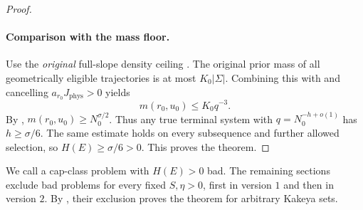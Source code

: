 \begin{proof}
\paragraph{Comparison with the mass floor.}
Use the \emph{original} full-slope density
ceiling .
The original prior mass of all geometrically eligible
trajectories is at most \(K_0|\Sigma|\).
Combining this with
and cancelling \(a_{r_0}J_{\mathrm{phys}}>0\) yields
\[
 m(r_0,u_0)\le K_0q^{-3}.
\]
By ,
\(m(r_0,u_0)\ge N_0^{\sigma/2}\).
Thus any true terminal system with
\(q=N_0^{-h+o(1)}\) has \(h\ge\sigma/6\).
The same estimate holds on every subsequence and
further allowed selection, so
\(H(E)\ge\sigma/6>0\).
This proves the theorem.
\end{proof}

We call a cap-class problem with \(H(E)>0\) bad.
The remaining sections exclude bad problems for every
fixed \(S,\eta>0\), first in version \(1\) and then in
version \(2\).  By , their
exclusion proves the theorem for arbitrary Kakeya sets.

